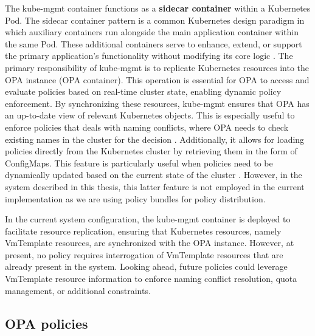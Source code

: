 The kube-mgmt container functions as a \textbf{sidecar container} within a Kubernetes Pod. The sidecar container pattern is a common Kubernetes design paradigm in which auxiliary containers run alongside the main application container within the same Pod. These additional containers serve to enhance, extend, or support the primary application's functionality without modifying its core logic \cite{sidecar_containers}. 
The primary responsibility of kube-mgmt is to replicate Kubernetes resources into the OPA instance (OPA container). This operation is essential for OPA to access and evaluate policies based on real-time cluster state, enabling dynamic policy enforcement. By synchronizing these resources, kube-mgmt ensures that OPA has an up-to-date view of relevant Kubernetes objects.
This is especially useful to enforce policies that deals with naming conflicts, where OPA needs to check existing names in the cluster for the decision \cite{kube-mgmt}.
Additionally, it allows for loading policies directly from the Kubernetes cluster by retrieving them in the form of ConfigMaps. This feature is particularly useful when policies need to be dynamically updated based on the current state of the cluster \cite{kube-mgmt}. However, in the system described in this thesis, this latter feature is not employed in the current implementation as we are using policy bundles for policy distribution.

In the current system configuration, the kube-mgmt container is deployed to facilitate resource replication, ensuring that Kubernetes resources, namely VmTemplate resources, are synchronized with the OPA instance. 
However, at present, no policy requires interrogation of VmTemplate resources that are already present in the system.
Looking ahead, future policies could leverage VmTemplate resource information to enforce naming conflict resolution, quota management, or additional constraints.

\subsection{OPA policies}
\label{sec:opa_policies}


